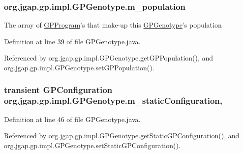 \hypertarget{classorg_1_1jgap_1_1gp_1_1impl_1_1_g_p_genotype_a32bf2d50f238455154d3466fc1ef09a1}{
\subsubsection[{m\-\_\-population}]{ org.\-jgap.\-gp.\-impl.\-G\-P\-Genotype.\-m\-\_\-population\hspace{0.3cm}{\ttfamily [private]}}}\label{classorg_1_1jgap_1_1gp_1_1impl_1_1_g_p_genotype_a32bf2d50f238455154d3466fc1ef09a1}
The array of \hyperlink{classorg_1_1jgap_1_1gp_1_1impl_1_1_g_p_program}{G\-P\-Program}'s that make-\/up this \hyperlink{classorg_1_1jgap_1_1gp_1_1impl_1_1_g_p_genotype}{G\-P\-Genotype}'s population 

Definition at line 39 of file G\-P\-Genotype.\-java.



Referenced by org.\-jgap.\-gp.\-impl.\-G\-P\-Genotype.\-get\-G\-P\-Population(), and org.\-jgap.\-gp.\-impl.\-G\-P\-Genotype.\-set\-G\-P\-Population().

\hypertarget{classorg_1_1jgap_1_1gp_1_1impl_1_1_g_p_genotype_a9e2b1a8103181690f4bb6e584463214c}{
\subsubsection[{m\-\_\-static\-Configuration}]{\setlength{\rightskip}{0pt plus 5cm}transient {\bf G\-P\-Configuration} org.\-jgap.\-gp.\-impl.\-G\-P\-Genotype.\-m\-\_\-static\-Configuration\hspace{0.3cm}{\ttfamily [static]}, {\ttfamily [private]}}}\label{classorg_1_1jgap_1_1gp_1_1impl_1_1_g_p_genotype_a9e2b1a8103181690f4bb6e584463214c}


Definition at line 46 of file G\-P\-Genotype.\-java.



Referenced by org.\-jgap.\-gp.\-impl.\-G\-P\-Genotype.\-get\-Static\-G\-P\-Configuration(), and org.\-jgap.\-gp.\-impl.\-G\-P\-Genotype.\-set\-Static\-G\-P\-Configuration().

